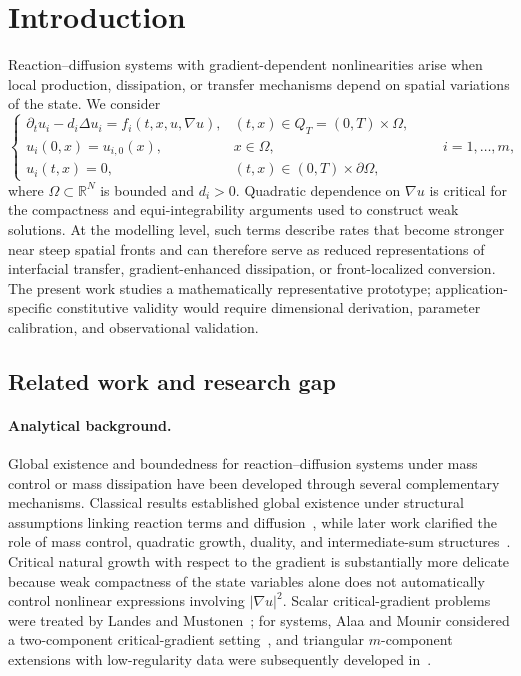 \section{Introduction}
\label{sec:introduction}

Reaction--diffusion systems with gradient-dependent nonlinearities arise when local production, dissipation, or transfer mechanisms depend on spatial variations of the state. We consider
\begin{equation}
\begin{cases}
\partial_tu_i-d_i\Delta u_i=f_i(t,x,u,\nabla u), &(t,x)\in Q_T=(0,T)\times\Omega,\\
u_i(0,x)=u_{i,0}(x),&x\in\Omega,\\
u_i(t,x)=0,&(t,x)\in(0,T)\times\partial\Omega,
\end{cases}
\qquad i=1,\ldots,m,
\label{eq:main_system}
\end{equation}
where $\Omega\subset\mathbb R^N$ is bounded and $d_i>0$. Quadratic dependence on $\nabla u$ is critical for the compactness and equi-integrability arguments used to construct weak solutions. At the modelling level, such terms describe rates that become stronger near steep spatial fronts and can therefore serve as reduced representations of interfacial transfer, gradient-enhanced dissipation, or front-localized conversion. The present work studies a mathematically representative prototype; application-specific constitutive validity would require dimensional derivation, parameter calibration, and observational validation.

\subsection{Related work and research gap}
\label{subsec:related-work}

\paragraph{Analytical background.}
Global existence and boundedness for reaction--diffusion systems under mass control or mass dissipation have been developed through several complementary mechanisms. Classical results established global existence under structural assumptions linking reaction terms and diffusion~\cite{hollis1987global,boudiba2000coupled}, while later work clarified the role of mass control, quadratic growth, duality, and intermediate-sum structures~\cite{pierre2010survey,souplet2018quadratic,fellner2020quadratic,cupps2021uniform,morgan2020intermediate}. Critical natural growth with respect to the gradient is substantially more delicate because weak compactness of the state variables alone does not automatically control nonlinear expressions involving $|\nabla u|^2$. Scalar critical-gradient problems were treated by Landes and Mustonen~\cite{landes1994parabolic}; for systems, Alaa and Mounir considered a two-component critical-gradient setting~\cite{alaa2001global}, and triangular $m$-component extensions with low-regularity data were subsequently developed in~\cite{alaa2013triangular,bouarifi2015climate}.

